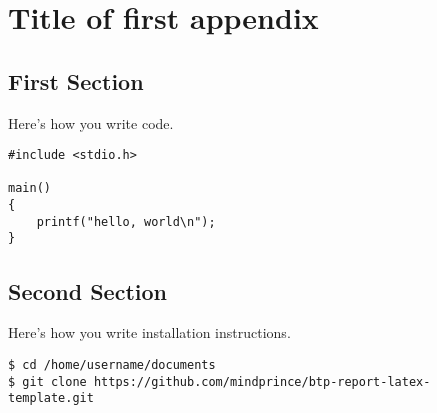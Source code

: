 \appendix
\chapter{Title of first appendix}
\section{First Section}
\label{append:labelforappendix}
Here's how you write code.
\begin{verbatim}
#include <stdio.h>

main()
{
    printf("hello, world\n");
}
\end{verbatim}

\section{Second Section}
Here's how you write installation instructions.
\begin{verbatim}
$ cd /home/username/documents
$ git clone https://github.com/mindprince/btp-report-latex-template.git
\end{verbatim}